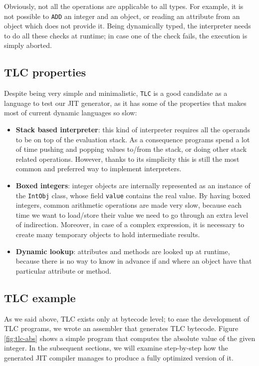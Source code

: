 Obviously, not all the operations are applicable to all types. For example,
it is not possible to \lstinline{ADD} an integer and an object, or reading an
attribute from an object which does not provide it.  Being dynamically typed,
the interpreter needs to do all these checks at runtime; in case one of the check
fails, the execution is simply aborted.

\subsection{TLC properties}
\label{sec:tlc-properties}

Despite being very simple and minimalistic, \lstinline{TLC} is a good
candidate as a language to test our JIT generator, as it has some of the
properties that makes most of current dynamic languages so slow:

\begin{itemize}

\item \textbf{Stack based interpreter}: this kind of interpreter requires all the operands to be
  on top of the evaluation stack.  As a consequence programs spend a lot of
  time pushing and popping values to/from the stack, or doing other stack
  related operations.  However, thanks to its simplicity this is still the
  most common and preferred way to implement interpreters.

\item \textbf{Boxed integers}: integer objects are internally represented as
  an instance of the \lstinline{IntObj} class, whose field \lstinline{value}
  contains the real value.  By having boxed integers, common arithmetic
  operations are made very slow, because each time we want to load/store their
  value we need to go through an extra level of indirection.  Moreover, in
  case of a complex expression, it is necessary to create many temporary
  objects to hold intermediate results.

\item \textbf{Dynamic lookup}: attributes and methods are looked up at
  runtime, because there is no way to know in advance if and where an object
  have that particular attribute or method.
\end{itemize}


\subsection{TLC example}

As we said above, TLC exists only at bytecode level; to ease the development
of TLC programs, we wrote an assembler that generates TLC bytecode. Figure \ref{fig:tlc-abs}
shows a simple program that computes the absolute value of
the given integer.  In the subsequent sections, we will examine step-by-step 
how the generated JIT compiler manages to produce a fully optimized version of it.

